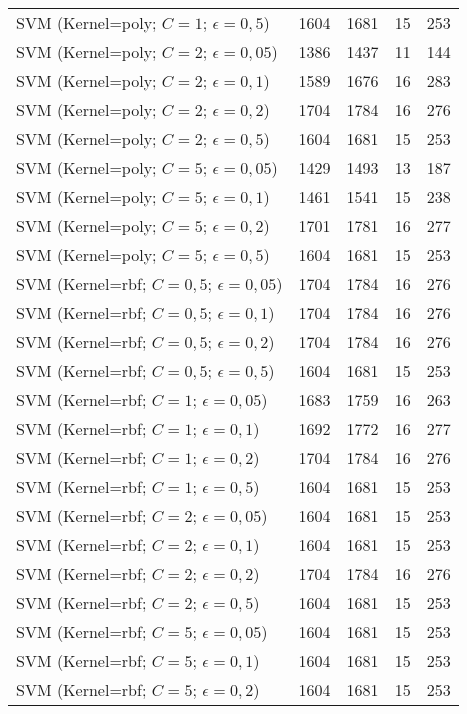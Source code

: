 \begin{center}
\begin{longtable}{|l|l|l|l|l|}
SVM (Kernel=poly; $C=1$; $\epsilon=0,5$) & 1604 & 1681 & 15 & 253 \\
SVM (Kernel=poly; $C=2$; $\epsilon=0,05$) & 1386 & 1437 & 11 & 144 \\
SVM (Kernel=poly; $C=2$; $\epsilon=0,1$) & 1589 & 1676 & 16 & 283 \\
SVM (Kernel=poly; $C=2$; $\epsilon=0,2$) & 1704 & 1784 & 16 & 276 \\
SVM (Kernel=poly; $C=2$; $\epsilon=0,5$) & 1604 & 1681 & 15 & 253 \\
SVM (Kernel=poly; $C=5$; $\epsilon=0,05$) & 1429 & 1493 & 13 & 187 \\
SVM (Kernel=poly; $C=5$; $\epsilon=0,1$) & 1461 & 1541 & 15 & 238 \\
SVM (Kernel=poly; $C=5$; $\epsilon=0,2$) & 1701 & 1781 & 16 & 277 \\
SVM (Kernel=poly; $C=5$; $\epsilon=0,5$) & 1604 & 1681 & 15 & 253 \\
SVM (Kernel=rbf; $C=0,5$; $\epsilon=0,05$) & 1704 & 1784 & 16 & 276 \\
SVM (Kernel=rbf; $C=0,5$; $\epsilon=0,1$) & 1704 & 1784 & 16 & 276 \\
SVM (Kernel=rbf; $C=0,5$; $\epsilon=0,2$) & 1704 & 1784 & 16 & 276 \\
SVM (Kernel=rbf; $C=0,5$; $\epsilon=0,5$) & 1604 & 1681 & 15 & 253 \\
SVM (Kernel=rbf; $C=1$; $\epsilon=0,05$) & 1683 & 1759 & 16 & 263 \\
SVM (Kernel=rbf; $C=1$; $\epsilon=0,1$) & 1692 & 1772 & 16 & 277 \\
SVM (Kernel=rbf; $C=1$; $\epsilon=0,2$) & 1704 & 1784 & 16 & 276 \\
SVM (Kernel=rbf; $C=1$; $\epsilon=0,5$) & 1604 & 1681 & 15 & 253 \\
SVM (Kernel=rbf; $C=2$; $\epsilon=0,05$) & 1604 & 1681 & 15 & 253 \\
SVM (Kernel=rbf; $C=2$; $\epsilon=0,1$) & 1604 & 1681 & 15 & 253 \\
SVM (Kernel=rbf; $C=2$; $\epsilon=0,2$) & 1704 & 1784 & 16 & 276 \\
SVM (Kernel=rbf; $C=2$; $\epsilon=0,5$) & 1604 & 1681 & 15 & 253 \\
SVM (Kernel=rbf; $C=5$; $\epsilon=0,05$) & 1604 & 1681 & 15 & 253 \\
SVM (Kernel=rbf; $C=5$; $\epsilon=0,1$) & 1604 & 1681 & 15 & 253 \\
SVM (Kernel=rbf; $C=5$; $\epsilon=0,2$) & 1604 & 1681 & 15 & 253 \\

\end{longtable}
\end{center}
